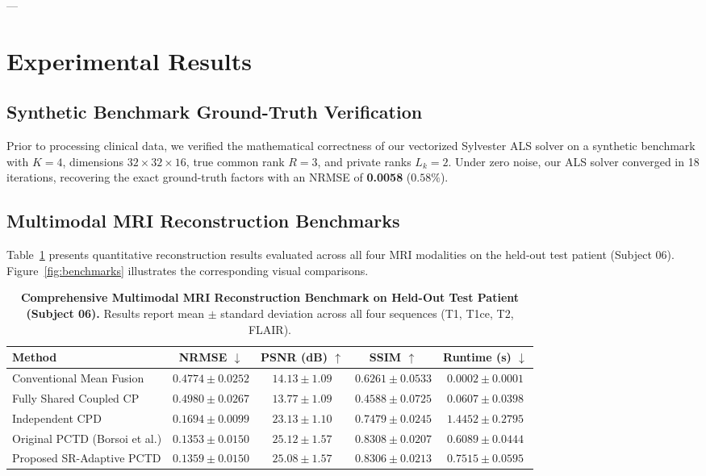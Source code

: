 \documentclass[11pt,a4paper]{article}
\begin{document}
---

\section{Experimental Results}
\label{sec:results}

\subsection{Synthetic Benchmark Ground-Truth Verification}
Prior to processing clinical data, we verified the mathematical correctness of our vectorized Sylvester ALS solver on a synthetic benchmark with $K=4$, dimensions $32 \times 32 \times 16$, true common rank $R=3$, and private ranks $L_k=2$. Under zero noise, our ALS solver converged in 18 iterations, recovering the exact ground-truth factors with an NRMSE of \textbf{0.0058} ($0.58\%$).

\subsection{Multimodal MRI Reconstruction Benchmarks}
Table~\ref{tab:benchmarks} presents quantitative reconstruction results evaluated across all four MRI modalities on the held-out test patient (Subject 06). Figure~\ref{fig:benchmarks} illustrates the corresponding visual comparisons.

\begin{table}[htbp]
\centering
\caption{\textbf{Comprehensive Multimodal MRI Reconstruction Benchmark on Held-Out Test Patient (Subject 06).} Results report mean $\pm$ standard deviation across all four sequences (T1, T1ce, T2, FLAIR).}
\label{tab:benchmarks}
\begin{tabular}{lcccc}
\toprule
\textbf{Method} & \textbf{NRMSE} $\downarrow$ & \textbf{PSNR (dB)} $\uparrow$ & \textbf{SSIM} $\uparrow$ & \textbf{Runtime (s)} $\downarrow$ \\
\midrule
Conventional Mean Fusion & $0.4774 \pm 0.0252$ & $14.13 \pm 1.09$ & $0.6261 \pm 0.0533$ & $\mathbf{0.0002} \pm 0.0001$ \\
Fully Shared Coupled CP & $0.4980 \pm 0.0267$ & $13.77 \pm 1.09$ & $0.4588 \pm 0.0725$ & $0.0607 \pm 0.0398$ \\
Independent CPD & $0.1694 \pm 0.0099$ & $23.13 \pm 1.10$ & $0.7479 \pm 0.0245$ & $1.4452 \pm 0.2795$ \\
Original PCTD (Borsoi et al.) & $\mathbf{0.1353} \pm 0.0150$ & $\mathbf{25.12} \pm 1.57$ & $\mathbf{0.8308} \pm 0.0207$ & $0.6089 \pm 0.0444$ \\
Proposed SR-Adaptive PCTD & $0.1359 \pm 0.0150$ & $25.08 \pm 1.57$ & $0.8306 \pm 0.0213$ & $0.7515 \pm 0.0595$ \\
\bottomrule
\end{tabular}
\end{table}
\end{document}
